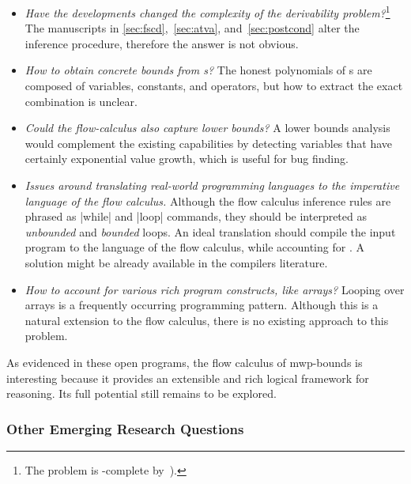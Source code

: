 \begin{itemize}
\item \emph{Have the developments changed the complexity of the derivability
        problem?}\footnote{The problem is -complete by~\cite[p.
        37]{jones2009}).}
      The manuscripts in \autoref{sec:fscd},~\autoref{sec:atva},
      and~\autoref{sec:postcond} alter the inference procedure, therefore the
      answer is not obvious.

\item \emph{How to obtain concrete bounds from s?}
      The honest polynomials of s are composed of variables,
      constants, and operators, but how to extract the exact combination is
      unclear.

\item \emph{Could the flow-calculus also capture lower bounds?}
      A lower bounds analysis would complement the existing capabilities by
      detecting variables that have certainly exponential value growth, which
      is useful \eg for bug finding.

\item \emph{Issues around translating real-world programming languages to the
      imperative language of the flow calculus.}
      Although the flow calculus inference rules are phrased as \pr|while| and
      \pr|loop| commands, they should be interpreted as \emph{unbounded} and
      \emph{bounded} loops. An ideal translation should compile the input
      program to the language of the flow calculus, while accounting for . A solution might be already available in the
      compilers literature.

\item \emph{How to account for various rich program constructs,
      like arrays?}
     Looping over arrays is a frequently occurring programming pattern.
     Although this is a natural extension to the flow calculus,
     there is no existing approach to this problem.

\end{itemize}

As evidenced in these open programs, the flow calculus of mwp-bounds is
interesting because it provides an extensible and rich logical framework for
reasoning. Its full potential still remains to be explored.

\subsubsection{Other Emerging Research Questions}
\label{ssec:other-open}

